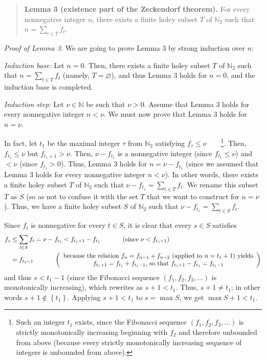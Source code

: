 \documentclass[12pt,final,notitlepage,onecolumn]{article}%
\begin{document}
\begin{quote}
\textbf{Lemma 3 (existence part of the Zeckendorf theorem).} For every
nonnegative integer $n$, there exists a finite holey subset $T$ of
$\mathbb{N}_{2}$ such that $n=\sum\limits_{t\in T}f_{t}$.
\end{quote}

\textit{Proof of Lemma 3.} We are going to prove Lemma 3 by strong induction
over $n$:

\textit{Induction base:} Let $n=0$. Then, there exists a finite holey subset
$T$ of $\mathbb{N}_{2}$ such that $n=\sum\limits_{t\in T}f_{t}$ (namely,
$T=\varnothing$), and thus Lemma 3 holds for $n=0$, and the induction base is completed.

\textit{Induction step:} Let $\nu\in\mathbb{N}$ be such that $\nu>0$. Assume
that Lemma 3 holds for every nonnegative integer $n<\nu$. We must now prove
that Lemma 3 holds for $n=\nu$.

In fact, let $t_{1}$ be the maximal integer $\tau$ from $\mathbb{N}_{2}$
satisfying $f_{\tau}\leq\nu$\ \ \ \ \footnote{Such an integer $t_{1}$ exists,
since the Fibonacci sequence $\left(  f_{1},f_{2},f_{3},...\right)  $ is
strictly monotonically increasing beginning with $f_{2}$ and therefore
unbounded from above (because every strictly monotonically increasing sequence
of integers is unbounded from above).}. Then, $f_{t_{1}}\leq\nu$ but
$f_{t_{1}+1}>\nu$. Then, $\nu-f_{t_{1}}$ is a nonnegative integer (since
$f_{t_{1}}\leq\nu$) and $<\nu$ (since $f_{t_{1}}>0$). Thus, Lemma 3 holds for
$n=\nu-f_{t_{1}}$ (since we assumed that Lemma 3 holds for every nonnegative
integer $n<\nu$). In other words, there exists a finite holey subset $T$ of
$\mathbb{N}_{2}$ such that $\nu-f_{t_{1}}=\sum\limits_{t\in T}f_{t}$. We
rename this subset $T$ as $S$ (so as not to confuse it with the set $T$ that
we want to construct for $n=\nu$). Thus, we have a finite holey subset $S$ of
$\mathbb{N}_{2}$ such that $\nu-f_{t_{1}}=\sum\limits_{t\in S}f_{t}$.

Since $f_{t}$ is nonnegative for every $t\in S$, it is clear that every $s\in
S$ satisfies%
\begin{align*}
f_{s}  &  \leq\sum\limits_{t\in S}f_{t}=\nu-f_{t_{1}}<f_{t_{1}+1}-f_{t_{1}%
}\ \ \ \ \ \ \ \ \ \ \left(  \text{since }\nu<f_{t_{1}+1}\right) \\
&  =f_{t_{1}-1}\ \ \ \ \ \ \ \ \ \ \left(
\begin{array}
[c]{c}%
\text{because the relation }f_{n}=f_{n-1}+f_{n-2}\text{ (applied to }%
n=t_{1}+1\text{) yields}\\
f_{t_{1}+1}=f_{t_{1}}+f_{t_{1}-1}\text{, so that }f_{t_{1}+1}-f_{t_{1}%
}=f_{t_{1}-1}%
\end{array}
\right)
\end{align*}
and thus $s<t_{1}-1$ (since the Fibonacci sequence $\left(  f_{1},f_{2}%
,f_{3},...\right)  $ is monotonically increasing), which rewrites as
$s+1<t_{1}$. Thus, $s+1\neq t_{1}$; in other words $s+1\notin\left\{
t_{1}\right\}  $. Applying $s+1<t_{1}$ to $s=\max S$, we get $\max S+1<t_{1}$.
\end{document}
